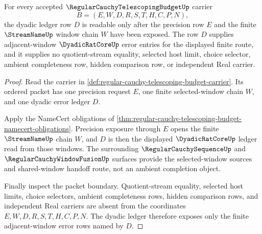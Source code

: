 \begin{theorem}
\label{thm:regular-cauchy-telescoping-budget-dyadic-ledger-exposure}
For every accepted $\RegularCauchyTelescopingBudgetUp$ carrier
$$
B=(E,W,D,R,S,T,H,C,P,N),
$$
the dyadic ledger row $D$ is readable only after the precision row $E$ and the finite $\StreamNameUp$ window chain $W$ have been exposed. The row $D$ supplies adjacent-window $\DyadicRatCoreUp$ error entries for the displayed finite route, and it supplies no quotient-stream equality, selected host limit, choice selector, ambient completeness row, hidden comparison row, or independent Real carrier.
\end{theorem}
\begin{proof}
Read the carrier in \autoref{def:regular-cauchy-telescoping-budget-carrier}. Its ordered packet has one precision request $E$, one finite selected-window chain $W$, and one dyadic error ledger $D$.

Apply the NameCert obligations of \autoref{thm:regular-cauchy-telescoping-budget-namecert-obligations}. Precision exposure through $E$ opens the finite $\StreamNameUp$ chain $W$, and $D$ is then the displayed $\DyadicRatCoreUp$ ledger read from those windows. The surrounding $\RegularCauchySequenceUp$ and $\RegularCauchyWindowFusionUp$ surfaces provide the selected-window sources and shared-window handoff route, not an ambient completion object.

Finally inspect the packet boundary. Quotient-stream equality, selected host limits, choice selectors, ambient completeness rows, hidden comparison rows, and independent Real carriers are absent from the coordinates $E,W,D,R,S,T,H,C,P,N$. The dyadic ledger therefore exposes only the finite adjacent-window error rows named by $D$.
\end{proof}

